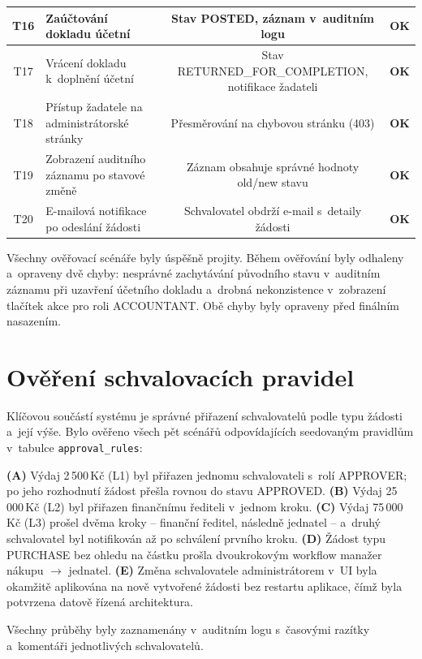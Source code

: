 \begin{table}[H]
\begin{tabularx}{\textwidth}{|c|X|c|c|}
\hline
T16 & Zaúčtování dokladu účetní & Stav POSTED, záznam v~auditním logu & \textbf{OK} \\
\hline
T17 & Vrácení dokladu k~doplnění účetní & Stav RETURNED\_FOR\_COMPLETION, notifikace žadateli & \textbf{OK} \\
\hline
T18 & Přístup žadatele na administrátorské stránky & Přesměrování na chybovou stránku (403) & \textbf{OK} \\
\hline
T19 & Zobrazení auditního záznamu po stavové změně & Záznam obsahuje správné hodnoty old/new stavu & \textbf{OK} \\
\hline
T20 & E-mailová notifikace po odeslání žádosti & Schvalovatel obdrží e-mail s~detaily žádosti & \textbf{OK} \\
\hline
\end{tabularx}
\end{table}

Všechny ověřovací scénáře byly úspěšně projity. Během ověřování byly
odhaleny a~opraveny dvě chyby: nesprávné zachytávání původního stavu
v~auditním záznamu při uzavření účetního dokladu a~drobná nekonzistence
v~zobrazení tlačítek akce pro roli ACCOUNTANT. Obě chyby byly opraveny
před finálním nasazením.

\section{Ověření schvalovacích pravidel}

Klíčovou součástí systému je správné přiřazení schvalovatelů podle
typu žádosti a~její výše. Bylo ověřeno všech pět scénářů odpovídajících
seedovaným pravidlům v~tabulce \texttt{approval\_rules}:

\textbf{(A)} Výdaj 2\,500\,Kč (L1) byl přiřazen jednomu schvalovateli s~rolí
APPROVER; po jeho rozhodnutí žádost přešla rovnou do stavu APPROVED.
\textbf{(B)} Výdaj 25\,000\,Kč (L2) byl přiřazen finančnímu řediteli v~jednom
kroku. \textbf{(C)} Výdaj 75\,000\,Kč (L3) prošel dvěma kroky -- finanční
ředitel, následně jednatel -- a~druhý schvalovatel byl notifikován
až po schválení prvního kroku. \textbf{(D)} Žádost typu PURCHASE bez
ohledu na částku prošla dvoukrokovým workflow manažer nákupu $\rightarrow$
jednatel. \textbf{(E)} Změna schvalovatele administrátorem v~UI byla
okamžitě aplikována na nově vytvořené žádosti bez restartu aplikace,
čímž byla potvrzena datově řízená architektura.

Všechny průběhy byly zaznamenány v~auditním logu s~časovými razítky
a~komentáři jednotlivých schvalovatelů.

